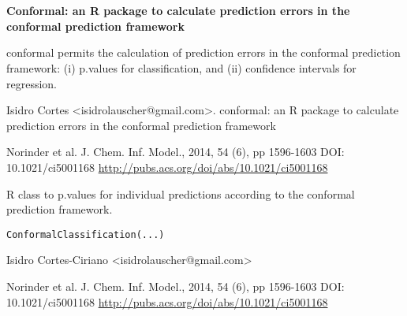 \documentclass[a4paper]{book}
\begin{document}
\chapter*{}
\begin{center}
{\textbf{\huge Conformal: an R package to calculate prediction errors in the conformal prediction framework}}
\par\bigskip{\large \today}
\end{center}
%
\begin{Description}\relax
conformal permits the calculation of prediction errors in the conformal prediction framework:
(i) p.values for classification, and
(ii) confidence intervals for regression.
\end{Description}
%
\begin{References}\relax
Isidro Cortes <isidrolauscher@gmail.com>.
conformal: an R package to calculate prediction errors in the conformal prediction framework

Norinder et al. J. Chem. Inf. Model., 2014, 54 (6), pp 1596-1603        
DOI: 10.1021/ci5001168       
\url{http://pubs.acs.org/doi/abs/10.1021/ci5001168}

\end{References}
%
\begin{Description}\relax
R class to p.values for individual 
predictions according to the conformal prediction framework.
\end{Description}
%
\begin{Usage}
\begin{verbatim}
ConformalClassification(...)
\end{verbatim}
\end{Usage}
%
\begin{Author}\relax
Isidro Cortes-Ciriano <isidrolauscher@gmail.com>
\end{Author}
%
\begin{References}\relax
Norinder et al. J. Chem. Inf. Model., 2014, 54 (6), pp 1596-1603
DOI: 10.1021/ci5001168
\url{http://pubs.acs.org/doi/abs/10.1021/ci5001168}
\end{References}
%
\begin{SeeAlso}\relax
{}
\end{SeeAlso}
\end{document}
